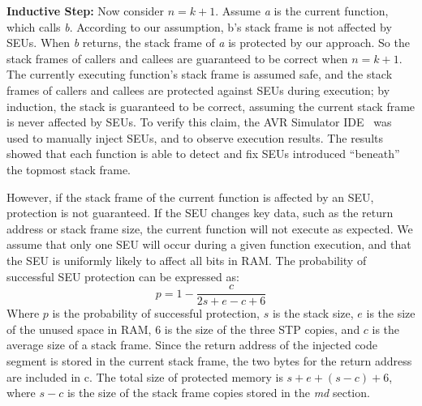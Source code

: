 \textbf{Inductive Step:} Now consider $n=k+1$. Assume \textit{a} is the current function, which calls \textit{b}. According to our assumption, b's stack frame is not affected by SEUs. When \textit{b} returns, the stack frame of \textit{a} is protected by our approach. So the stack frames of callers and callees are guaranteed to be correct when $n=k+1$. The currently executing function's stack frame is assumed safe, and the stack frames of callers and callees are protected against SEUs during execution; by induction, the stack is guaranteed to be correct, assuming the current stack frame is never affected by SEUs.
To verify this claim, the AVR Simulator IDE~\cite{avrsimide} was used to manually inject SEUs, and to observe execution results. The results showed that each function is able to detect and fix SEUs introduced ``beneath'' the topmost stack frame.

However, if the stack frame of the current function is affected by an SEU, protection is not guaranteed. If the SEU changes key data, such as the return address or stack frame size, the current function will not execute as expected. We assume that only one SEU will occur during a given function execution, and that the SEU is uniformly likely to affect all bits in RAM. The probability of successful SEU protection can be expressed as:
\begin{equation}\label{eq_seu1}
p=1-\frac{c}{2s+e-c+6}
\end{equation}
Where $p$ is the probability of successful protection, $s$ is the stack size, $e$ is the size of the unused space in RAM, $6$ is the size of the three STP copies, and $c$ is the average size of a stack frame. Since the return address of the injected code segment is stored in the current stack frame, the two bytes for the return address are included in c. The total size of protected memory is $s+e+(s-c)+6$, where $s-c$ is the size of the stack frame copies stored in the \textit{md} section.

